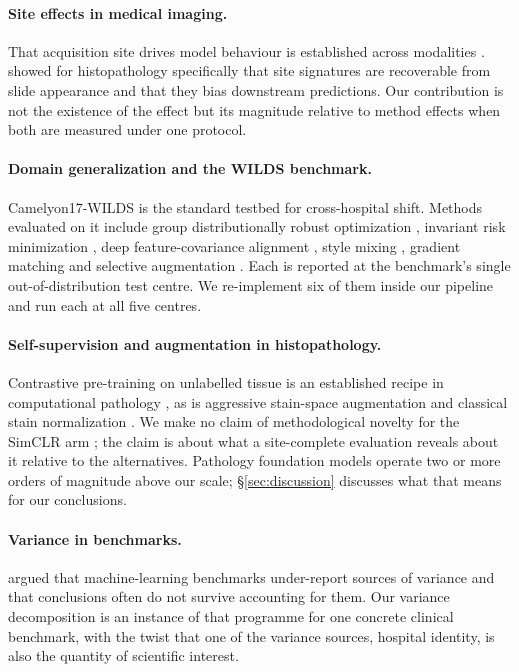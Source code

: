 \documentclass[10pt]{article} %
\begin{document}
\paragraph{Site effects in medical imaging.} That acquisition site drives model
behaviour is established across modalities
\citep{zech2018variable,yu2022external}. \citet{howard2021site} showed for
histopathology specifically that site signatures are recoverable from slide
appearance and that they bias downstream predictions. Our contribution is not
the existence of the effect but its magnitude relative to method effects when
both are measured under one protocol.

\paragraph{Domain generalization and the WILDS benchmark.}
Camelyon17-WILDS \citep{koh2021wilds,bandi2019camelyon17} is the standard
testbed for cross-hospital shift. Methods evaluated on it include group
distributionally robust optimization \citep{sagawa2020groupdro}, invariant risk
minimization \citep{arjovsky2019irm}, deep feature-covariance alignment
\citep{sun2016coral}, style mixing \citep{zhou2021mixstyle}, gradient matching
\citep{shi2022fish} and selective augmentation \citep{yao2022lisa}. Each is
reported at the benchmark's single out-of-distribution test centre. We
re-implement six of them inside our pipeline and run each at all five centres.

\paragraph{Self-supervision and augmentation in histopathology.} Contrastive
pre-training on unlabelled tissue is an established recipe in computational
pathology \citep{ciga2022ssl}, as is aggressive stain-space augmentation
\citep{tellez2019stain} and classical stain normalization
\citep{macenko2009}. We make no claim of methodological novelty for the SimCLR
arm \citep{chen2020simclr}; the claim is about what a site-complete evaluation
reveals about it relative to the alternatives. Pathology foundation models
\citep{chen2024uni} operate two or more orders of magnitude above our scale;
\S\ref{sec:discussion} discusses what that means for our conclusions.

\paragraph{Variance in benchmarks.} \citet{bouthillier2021variance} argued that
machine-learning benchmarks under-report sources of variance and that
conclusions often do not survive accounting for them. Our variance
decomposition is an instance of that programme for one concrete clinical
benchmark, with the twist that one of the variance sources, hospital identity,
is also the quantity of scientific interest.
\end{document}

